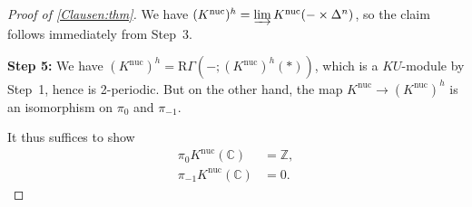 \documentclass[draft]{amsart}
\newcommand{\ZZ}{\mathbb{Z}}
\newcommand{\CC}{\mathbb{C}}
\newcommand{\R}{\mathrm{R}}
\newcommand{\blank}{-} %
\theoremstyle{definition}
\begin{document}
\begin{proof}[Proof of \cref{Clausen:thm}]
We have $(K^{\mathrm{nuc}})^h = \varinjlim K^{\mathrm{nuc}}(\blank\times \Delta^n)$, so the claim follows immediately from Step~3.
\medskip

\textbf{Step 5:} We have $(K^{\mathrm{nuc}})^h = \R\Gamma(\blank; (K^{\mathrm{nuc}})^h(*))$, which is a $KU$-module by Step~1, hence is 2-periodic. But on the other hand, the map $K^{\mathrm{nuc}} \to (K^{\mathrm{nuc}})^h$ is an isomorphism on $\pi_0$ and $\pi_{-1}$.

It thus suffices to show 
\begin{align*}
\pi_0K^{\mathrm{nuc}}(\CC) &= \ZZ, \\
\pi_{-1}K^{\mathrm{nuc}}(\CC) &= 0.
\end{align*}
\end{proof}
\end{document}
